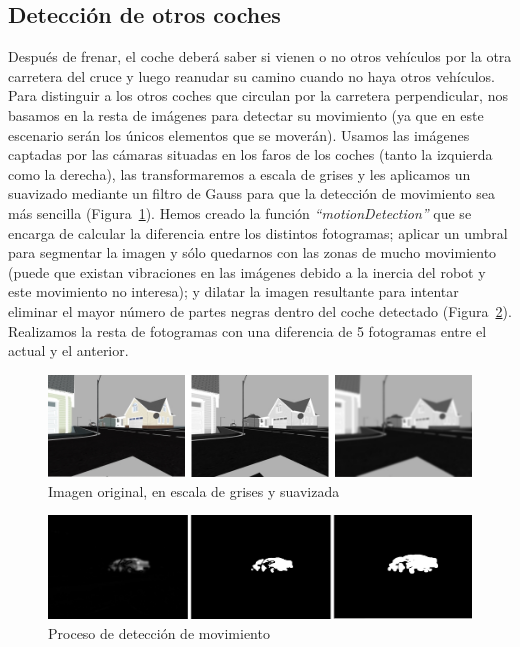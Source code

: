 \subsection{Detección de otros coches}
Después de frenar, el coche deberá saber si vienen o no otros vehículos por la otra carretera del cruce y luego reanudar su camino cuando no haya otros vehículos. Para distinguir a los otros coches que circulan por la carretera perpendicular, nos basamos en la resta de imágenes para detectar su movimiento (ya que en este escenario serán los únicos elementos que se moverán). Usamos las imágenes captadas por las cámaras situadas en los faros de los coches (tanto la izquierda como la derecha), las transformaremos a escala de grises y les aplicamos un suavizado mediante un filtro de Gauss para que la detección de movimiento sea más sencilla (Figura~\ref{fig.imgL}). Hemos creado la función \textit{``motionDetection''} que se encarga de calcular la diferencia entre los distintos fotogramas; aplicar un umbral para segmentar la imagen y sólo quedarnos con las zonas de mucho movimiento (puede que existan vibraciones en las imágenes debido a la inercia del robot y este movimiento no interesa); y dilatar la imagen resultante para intentar eliminar el mayor número de partes negras dentro del coche detectado (Figura~\ref{fig.motionDetection}). Realizamos la resta de fotogramas con una diferencia de 5 fotogramas entre el actual y el anterior. 

\begin{figure}[H]
  \begin{center}
    \includegraphics[width=1.0\textwidth]{figures/Stop/imgL.jpg}
		\caption{Imagen original, en escala de grises y suavizada}
		\label{fig.imgL}
		\end{center}
\end{figure}

\begin{figure}[H]
  \begin{center}
    \includegraphics[width=1.0\textwidth]{figures/Stop/motionDetection.jpg}
		\caption{Proceso de detección de movimiento}
		\label{fig.motionDetection}
		\end{center}
\end{figure}

